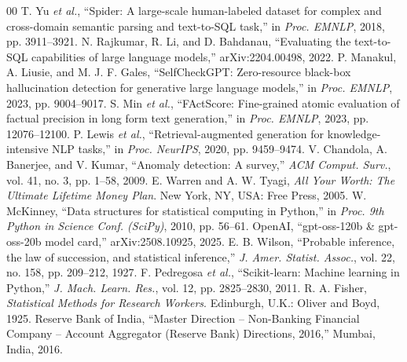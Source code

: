 \documentclass[conference]{IEEEtran}
\begin{document}
\begin{thebibliography}{00}
 T. Yu \emph{et al.}, ``Spider: A large-scale human-labeled dataset for complex and cross-domain semantic parsing and text-to-SQL task,'' in \emph{Proc. EMNLP}, 2018, pp. 3911--3921.
 N. Rajkumar, R. Li, and D. Bahdanau, ``Evaluating the text-to-SQL capabilities of large language models,'' arXiv:2204.00498, 2022.
 P. Manakul, A. Liusie, and M. J. F. Gales, ``SelfCheckGPT: Zero-resource black-box hallucination detection for generative large language models,'' in \emph{Proc. EMNLP}, 2023, pp. 9004--9017.
 S. Min \emph{et al.}, ``FActScore: Fine-grained atomic evaluation of factual precision in long form text generation,'' in \emph{Proc. EMNLP}, 2023, pp. 12076--12100.
 P. Lewis \emph{et al.}, ``Retrieval-augmented generation for knowledge-intensive NLP tasks,'' in \emph{Proc. NeurIPS}, 2020, pp. 9459--9474.
 V. Chandola, A. Banerjee, and V. Kumar, ``Anomaly detection: A survey,'' \emph{ACM Comput. Surv.}, vol. 41, no. 3, pp. 1--58, 2009.
 E. Warren and A. W. Tyagi, \emph{All Your Worth: The Ultimate Lifetime Money Plan}. New York, NY, USA: Free Press, 2005.
 W. McKinney, ``Data structures for statistical computing in Python,'' in \emph{Proc. 9th Python in Science Conf. (SciPy)}, 2010, pp. 56--61.
 OpenAI, ``gpt-oss-120b \& gpt-oss-20b model card,'' arXiv:2508.10925, 2025.
 E. B. Wilson, ``Probable inference, the law of succession, and statistical inference,'' \emph{J. Amer. Statist. Assoc.}, vol. 22, no. 158, pp. 209--212, 1927.
 F. Pedregosa \emph{et al.}, ``Scikit-learn: Machine learning in Python,'' \emph{J. Mach. Learn. Res.}, vol. 12, pp. 2825--2830, 2011.
 R. A. Fisher, \emph{Statistical Methods for Research Workers}. Edinburgh, U.K.: Oliver and Boyd, 1925.
 Reserve Bank of India, ``Master Direction -- Non-Banking Financial Company -- Account Aggregator (Reserve Bank) Directions, 2016,'' Mumbai, India, 2016.
\end{thebibliography}
\end{document}
